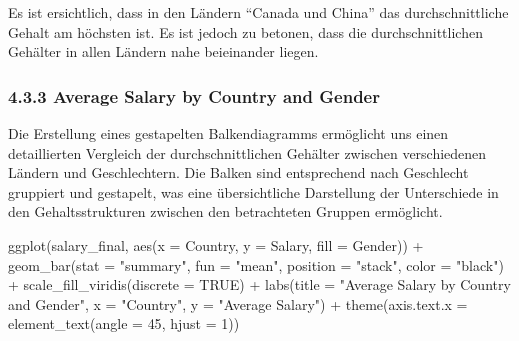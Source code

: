 \documentclass[
  letterpaper,
  DIV=11,
  numbers=noendperiod]{scrartcl}
\newenvironment{Shaded}{\begin{snugshade}}{\end{snugshade}}
\newcommand{\AttributeTok}[1]{\textcolor[rgb]{0.40,0.45,0.13}{#1}}
\newcommand{\ConstantTok}[1]{\textcolor[rgb]{0.56,0.35,0.01}{#1}}
\newcommand{\DecValTok}[1]{\textcolor[rgb]{0.68,0.00,0.00}{#1}}
\newcommand{\FunctionTok}[1]{\textcolor[rgb]{0.28,0.35,0.67}{#1}}
\newcommand{\NormalTok}[1]{\textcolor[rgb]{0.00,0.23,0.31}{#1}}
\newcommand{\SpecialCharTok}[1]{\textcolor[rgb]{0.37,0.37,0.37}{#1}}
\newcommand{\StringTok}[1]{\textcolor[rgb]{0.13,0.47,0.30}{#1}}
\begin{document}
Es ist ersichtlich, dass in den Ländern ``Canada und China'' das
durchschnittliche Gehalt am höchsten ist. Es ist jedoch zu betonen, dass
die durchschnittlichen Gehälter in allen Ländern nahe beieinander
liegen.

\hypertarget{average-salary-by-country-and-gender}{%
\subsubsection{4.3.3 Average Salary by Country and
Gender}\label{average-salary-by-country-and-gender}}

Die Erstellung eines gestapelten Balkendiagramms ermöglicht uns einen
detaillierten Vergleich der durchschnittlichen Gehälter zwischen
verschiedenen Ländern und Geschlechtern. Die Balken sind entsprechend
nach Geschlecht gruppiert und gestapelt, was eine übersichtliche
Darstellung der Unterschiede in den Gehaltsstrukturen zwischen den
betrachteten Gruppen ermöglicht.

\begin{Shaded}
\begin{Highlighting}[]
\FunctionTok{ggplot}\NormalTok{(salary\_final, }\FunctionTok{aes}\NormalTok{(}\AttributeTok{x =}\NormalTok{ Country, }\AttributeTok{y =}\NormalTok{ Salary, }\AttributeTok{fill =}\NormalTok{ Gender)) }\SpecialCharTok{+}
  \FunctionTok{geom\_bar}\NormalTok{(}\AttributeTok{stat =} \StringTok{"summary"}\NormalTok{, }\AttributeTok{fun =} \StringTok{"mean"}\NormalTok{, }\AttributeTok{position =} \StringTok{"stack"}\NormalTok{, }\AttributeTok{color =} \StringTok{"black"}\NormalTok{) }\SpecialCharTok{+}
  \FunctionTok{scale\_fill\_viridis}\NormalTok{(}\AttributeTok{discrete =} \ConstantTok{TRUE}\NormalTok{) }\SpecialCharTok{+}
  \FunctionTok{labs}\NormalTok{(}\AttributeTok{title =} \StringTok{"Average Salary by Country and Gender"}\NormalTok{,}
       \AttributeTok{x =} \StringTok{"Country"}\NormalTok{,}
       \AttributeTok{y =} \StringTok{"Average Salary"}\NormalTok{) }\SpecialCharTok{+}
  \FunctionTok{theme}\NormalTok{(}\AttributeTok{axis.text.x =} \FunctionTok{element\_text}\NormalTok{(}\AttributeTok{angle =} \DecValTok{45}\NormalTok{, }\AttributeTok{hjust =} \DecValTok{1}\NormalTok{)) }
\end{Highlighting}
\end{Shaded}
\end{document}
